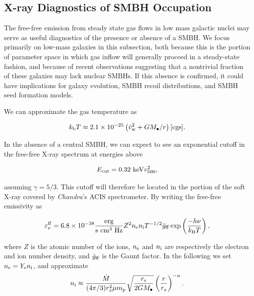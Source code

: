 \documentclass[usenatbib,fleqn]{mn2e}
\newcommand{\rs}{r_s}
\newcommand{\kb}{k_{\rm b}}
\renewcommand{\mp}{m_{\rm p}}
\newcommand{\Mbh}[1][]{M_{\bullet#1}}
\begin{document}
\subsection{X-ray Diagnostics of SMBH Occupation}
\label{sec:occ}
The free-free emission from steady state gas flows in low mass
galactic nuclei may serve as useful diagnostics of the presence or
absence of a SMBH.  We focus primarily on low-mass galaxies in this
subsection, both because this is the portion of parameter space in
which gas inflow will generally proceed in a steady-state fashion, and
because of recent observations suggesting that a nontrivial fraction
of these galaxies may lack nuclear SMBHs.  If this absence is
confirmed, it could have implications for galaxy evolution, SMBH
recoil distributions, and SMBH seed formation models.

We can approximate the gas temperature as 

\begin{equation}
 \kb T \approx 2.1\times 10^{-25} \left(\tilde{v}_{\rm w}^2 + GM_\bullet/r
 \right) {\rm [cgs]}.
\end{equation}

In the absence of a central SMBH, we can expect to see an exponential
cutoff in the free-free X-ray spectrum at energies above

\begin{equation}
E_{\rm cut} = 0.32~{\rm keV} v_{500}^2,
\end{equation}

assuming $\gamma = 5/3$.  This cutoff will therefore be located in the
portion of the soft X-ray covered by {\it Chandra}'s ACIS
spectrometer.  By writing the free-free emissivity as

\begin{equation} 
\varepsilon_{\nu}^{\rm ff} = 6.8\times10^{-38}
\frac{\rm erg}{\rm s~cm^3~Hz} Z^2n_{\rm e}n_{\rm
i}T^{-1/2}\bar{g}_{\rm ff}\exp\left(\frac{-h\nu}{k_{\rm B}T}\right),
\end{equation}

where $Z$ is the atomic number of the ions, $n_{\rm e}$ and $n_{\rm
  i}$ are respectively the electron and ion number density, and
$\bar{g}_{\rm ff}$ is the Gaunt factor.  In the following we set
$n_{\rm e}=Y_{\rm e}n_{\rm i}$, and approximate
\begin{equation}
n_{\rm i} \approx \frac{\dot{M}}{(4\pi/3) \rs^2 \mu \mp}\sqrt{ \frac{r_{\rm s}}{ 2 G \Mbh} } \left( \frac{r}{\rs} \right)^{-n}.
\end{equation}
\end{document}
